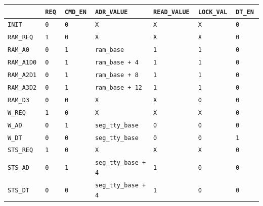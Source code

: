 \documentclass{article}
\begin{document}
\begin{table}[H]
\centering
\begingroup
\setlength{\tabcolsep}{5pt}
\renewcommand{\arraystretch}{1.1}
\begin{tabular}{|l|l|l|l|l|l|l|}
\hline
                  & \tt{REQ}       & \tt{CMD\_EN}   & \tt{ADR\_VALUE}         & \tt{READ\_VALUE}   & \tt{LOCK\_VAL} & \tt{DT\_EN}    \\
\hline
\tt{INIT}         & \tt{0}         & \tt{0}         & \tt{X}                  & \tt{X}             & \tt{X}         & \tt{0}         \\
\tt{RAM\_REQ}     & \tt{1}         & \tt{0}         & \tt{X}                  & \tt{X}             & \tt{X}         & \tt{0}         \\
\tt{RAM\_A0}      & \tt{0}         & \tt{1}         & \tt{ram\_base}          & \tt{1}             & \tt{1}         & \tt{0}         \\
\tt{RAM\_A1D0}    & \tt{0}         & \tt{1}         & \tt{ram\_base + 4}      & \tt{1}             & \tt{1}         & \tt{0}         \\
\tt{RAM\_A2D1}    & \tt{0}         & \tt{1}         & \tt{ram\_base + 8}      & \tt{1}             & \tt{1}         & \tt{0}         \\
\tt{RAM\_A3D2}    & \tt{0}         & \tt{1}         & \tt{ram\_base + 12}     & \tt{1}             & \tt{1}         & \tt{0}         \\
\tt{RAM\_D3}      & \tt{0}         & \tt{0}         & \tt{X}                  & \tt{X}             & \tt{0}         & \tt{0}         \\
\tt{W\_REQ}       & \tt{1}         & \tt{0}         & \tt{X}                  & \tt{X}             & \tt{X}         & \tt{0}         \\
\tt{W\_AD}        & \tt{0}         & \tt{1}         & \tt{seg\_tty\_base}     & \tt{0}             & \tt{0}         & \tt{0}         \\
\tt{W\_DT}        & \tt{0}         & \tt{0}         & \tt{seg\_tty\_base}     & \tt{0}             & \tt{0}         & \tt{1}         \\
\tt{STS\_REQ}     & \tt{1}         & \tt{0}         & \tt{X}                  & \tt{X}             & \tt{X}         & \tt{0}         \\
\tt{STS\_AD}      & \tt{0}         & \tt{1}         & \tt{seg\_tty\_base + 4} & \tt{1}             & \tt{0}         & \tt{0}         \\
\tt{STS\_DT}      & \tt{0}         & \tt{0}         & \tt{seg\_tty\_base + 4} & \tt{1}             & \tt{0}         & \tt{0}         \\

\end{tabular}
\end{table}
\end{document}
